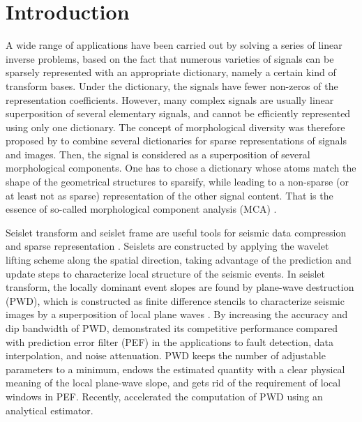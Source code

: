 \section{Introduction}

A wide range of applications have been carried out by solving a series of linear inverse problems, based on the fact that numerous varieties of signals can be sparsely represented with an appropriate dictionary, namely a certain kind of transform bases. Under the dictionary, the signals have fewer non-zeros of the representation coefficients. However, many complex signals are usually linear superposition of several elementary signals, and cannot be efficiently represented using only one dictionary. The concept of morphological diversity was therefore proposed by \cite{starck2004redundant,starck2005image} to combine several dictionaries for sparse representations of signals and images. Then, the signal is considered as a superposition of several morphological components. One has to chose a dictionary whose atoms match the shape of the geometrical structures to sparsify, while leading to a non-sparse (or at least not as sparse) representation of the other signal content. That is the essence of so-called morphological component analysis (MCA) \citep{starck2004redundant,starck2007undecimated,woiselle20113}.

Seislet transform and seislet frame are useful tools for seismic data compression and sparse representation \citep{fomel2010seislet}. Seislets are constructed by applying the wavelet lifting scheme \citep{sweldens1998lifting} along the spatial direction, taking advantage of the prediction and update steps to characterize local structure of the seismic events.
In seislet transform, the locally dominant event slopes are found by plane-wave destruction (PWD), which is constructed as finite difference stencils to characterize seismic images by a superposition of local plane waves \citep{claerbout1992earth}. By increasing the accuracy and dip bandwidth of PWD, \cite{fomel2002applications} demonstrated its competitive performance compared with prediction error filter (PEF) in the applications to fault detection, data interpolation, and noise attenuation. PWD keeps the number of adjustable parameters to a minimum, endows the estimated quantity with a clear physical meaning of the local plane-wave slope, and gets rid of the requirement of local windows in PEF. Recently, \cite{chen2013accelerated} accelerated the computation of PWD using an analytical estimator.


